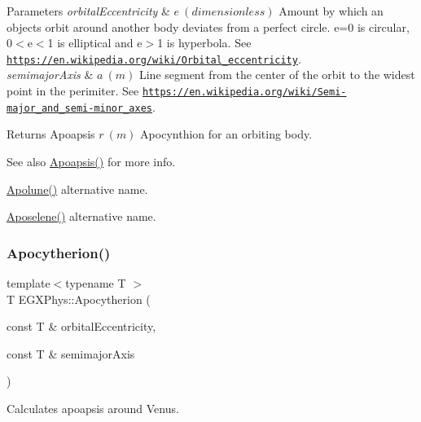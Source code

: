 \begin{DoxyParams}{Parameters}
{\em orbital\+Eccentricity} & $ e\ (dimensionless)$ Amount by which an objects orbit around another body deviates from a perfect circle. e=0 is circular, 0$<$e$<$1 is elliptical and e$>$1 is hyperbola. See \href{https://en.wikipedia.org/wiki/Orbital_eccentricity}{\tt https\+://en.\+wikipedia.\+org/wiki/\+Orbital\+\_\+eccentricity}. \\
\hline
{\em semimajor\+Axis} & $ a\ (m)$ Line segment from the center of the orbit to the widest point in the perimiter. See \href{https://en.wikipedia.org/wiki/Semi-major_and_semi-minor_axes}{\tt https\+://en.\+wikipedia.\+org/wiki/\+Semi-\/major\+\_\+and\+\_\+semi-\/minor\+\_\+axes}. \\
\hline
\end{DoxyParams}
\begin{DoxyReturn}{Returns}
Apoapsis $ r\ (m)$ Apocynthion for an orbiting body. 
\end{DoxyReturn}
\begin{DoxySeeAlso}{See also}
\mbox{\hyperlink{group___e_g_x_phys-_apoapsis_gaf962e650bf84a568458e8eb39b1c61ba}{Apoapsis()}} for more info. 

\mbox{\hyperlink{group___e_g_x_phys-_apoapsis_gacc68b49812c38394611e1ef3a8bf0e3e}{Apolune()}} alternative name. 

\mbox{\hyperlink{group___e_g_x_phys-_apoapsis_gab61f3b2d6a5be3f62f5fb6dfdf802014}{Aposelene()}} alternative name. 
\end{DoxySeeAlso}
\mbox{\label{group___e_g_x_phys-_apoapsis_ga59a284bb0bc11848c5b9ef1283033425}} 
\subsubsection{\texorpdfstring{Apocytherion()}{Apocytherion()}}
{\footnotesize\ttfamily template$<$typename T $>$ \\
T E\+G\+X\+Phys\+::\+Apocytherion (\begin{DoxyParamCaption}\item[{const T \&}]{orbital\+Eccentricity,  }\item[{const T \&}]{semimajor\+Axis }\end{DoxyParamCaption})}



Calculates apoapsis around Venus. 


